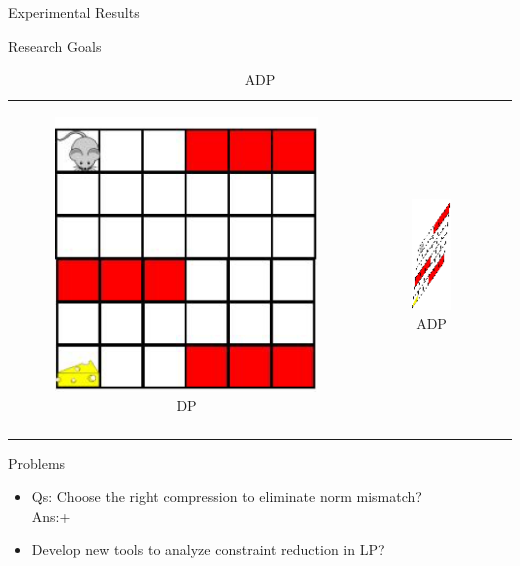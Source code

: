 \documentclass[10pt,handout]{beamer}
\begin{document}
\begin{frame}{Experimental Results}
\end{frame}


\begin{frame}[fragile]{Research Goals}
\begin{table}
\begin{tabular}{ccc}

\begin{minipage}{0.3\textwidth}
\begin{figure}
\includegraphics[scale=0.2]{mouse-single.png}
\caption*{DP}
\end{figure}
\end{minipage}
&
\begin{minipage}{0.3\textwidth}
\begin{figure}
\includegraphics[scale=0.2]{compress-mouse.png}
\caption*{ADP}
\end{figure}
\end{minipage}
&
\begin{minipage}{0.3\textwidth}
{\color{orange}{$\norm{J^*-J_{\tu}}$}}\\
\end{minipage}
\end{tabular}
\end{table}
\begin{block}{Problems}
\begin{itemize}
\item Qs: Choose the right compression to eliminate norm mismatch?\\
{Ans:\color{teal}{$\minp$ linear basis}}+ \cite{melo2007q}
\item Develop new tools to analyze constraint reduction in LP?
\end{itemize}
\end{block}
\end{frame}
\end{document}
